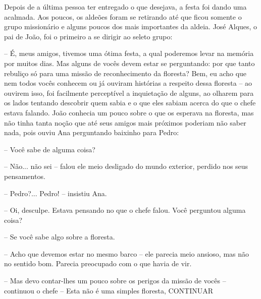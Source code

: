 Depois de a última pessoa ter entregado o que desejava, a festa foi dando uma acalmada. Aos poucos, os aldeões foram se retirando até que ficou somente o grupo missionário e alguns poucos dos mais importantes da aldeia. José Alques, o pai de João, foi o primeiro a se dirigir ao seleto grupo:

-- É, meus amigos, tivemos uma ótima festa, a qual poderemos levar na memória por muitos dias. Mas alguns de vocês devem estar se perguntando: por que tanto rebuliço só para uma missão de reconhecimento da floresta? Bem, eu acho que nem todos vocês conhecem ou já ouviram histórias a respeito dessa floresta -- ao ouvirem isso, foi facilmente perceptível a inquietação de alguns, ao olharem para os lados tentando descobrir quem sabia e o que eles sabiam acerca do que o chefe estava falando. João conhecia um pouco sobre o que os esperava na floresta, mas não tinha tanta noção que até seus amigos mais próximos poderiam não saber nada, pois ouviu Ana perguntando baixinho para Pedro:

-- Você sabe de alguma coisa?

-- Não... não sei -- falou ele meio desligado do mundo exterior, perdido nos seus pensamentos.

-- Pedro?... Pedro! -- insistiu Ana.

-- Oi, desculpe. Estava pensando no que o chefe falou. Você perguntou alguma coisa?

-- Se você sabe algo sobre a floresta.

-- Acho que devemos estar no mesmo barco -- ele parecia meio ansioso, mas não no sentido bom. Parecia preocupado com o que havia de vir.

-- Mas devo contar-lhes um pouco sobre os perigos da missão de vocês -- continuou o chefe -- Esta não é uma simples floresta, CONTINUAR
